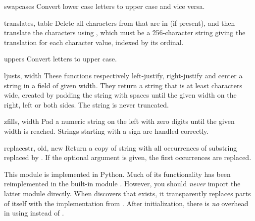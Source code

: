 \begin{funcdesc}{swapcase}{s}
Convert lower case letters to upper case and vice versa.
\end{funcdesc}

\begin{funcdesc}{translate}{s, table}
Delete all characters from  that are in  (if
present), and then translate the characters using , which
must be a 256-character string giving the translation for each
character value, indexed by its ordinal.  
\end{funcdesc}

\begin{funcdesc}{upper}{s}
Convert letters to upper case.
\end{funcdesc}

\begin{funcdesc}{ljust}{s, width}
These functions respectively left-justify, right-justify and center a
string in a field of given width.
They return a string that is at least
characters wide, created by padding the string
with spaces until the given width on the right, left or both sides.
The string is never truncated.
\end{funcdesc}

\begin{funcdesc}{zfill}{s, width}
Pad a numeric string on the left with zero digits until the given
width is reached.  Strings starting with a sign are handled correctly.
\end{funcdesc}

\begin{funcdesc}{replace}{str, old, new}
Return a copy of string  with all occurrences of substring
 replaced by .  If the optional argument
 is given, the first  occurrences are
replaced.
\end{funcdesc}

This module is implemented in Python.  Much of its functionality has
been reimplemented in the built-in module
.  However, you
should \emph{never} import the latter module directly.  When
 discovers that  exists, it transparently
replaces parts of itself with the implementation from .
After initialization, there is \emph{no} overhead in using
 instead of .
